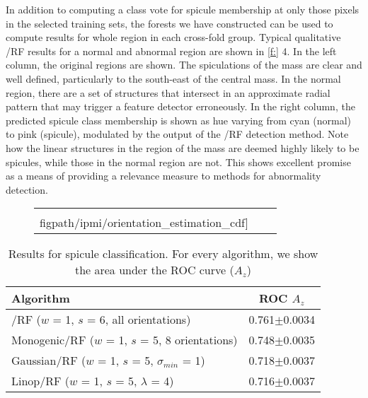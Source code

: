In addition to computing a class vote for spicule membership at only those pixels in the selected training sets, the forests we have constructed can be used to compute results for whole region in each cross-fold group. Typical qualitative \dtcwt{}/RF results for a normal and abnormal region are shown in \ref{f:} 4. In the left column, the original regions are shown. The spiculations of the mass are clear and well defined, particularly to the south-east of the central mass. In the normal region, there are a set of structures that intersect in an approximate radial pattern that may trigger a feature detector erroneously. In the right column, the predicted spicule class membership is shown as hue varying from cyan (normal) to pink (spicule), modulated by the output of the \dtcwt{}/RF detection method. Note how the linear structures in the region of the mass are deemed highly likely to be spicules, while those in the normal region are not. This shows excellent promise as a means of providing a relevance measure to methods for abnormality detection.

\begin{figure}
\centering
\begin{tabular}{c c c}
\texttt{[image: \\figpath/ipmi/orientation\_estimation\_cdf]} &
\end{tabular}
\end{figure}

\begin{table}
\caption{Results for spicule classification. For every algorithm, we show the area under the ROC curve ($A_z$)}
\label{t:spicule_classification}
%
\begin{tabular}{l c}
Algorithm
		& ROC $A_z$ \\
\hline
\dtcwt{}/RF ($w$ = 1, $s$ = 6, all orientations)
		& 0.761$\pm$0.0034 \\
Monogenic/RF ($w$ = 1, $s$ = 5, 8 orientations)
		& 0.748$\pm$0.0035 \\
Gaussian/RF ($w$ = 1, $s$ = 5, $\sigma_{min}$ = 1)
		& 0.718$\pm$0.0037 \\
Linop/RF ($w$ = 1, $s$ = 5, $\lambda$ = 4)
		& 0.716$\pm$0.0037 \\
\end{tabular}
\end{table}

